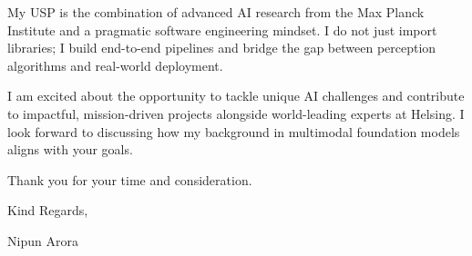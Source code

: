 \documentclass[11pt, a4paper]{letter}
\begin{document}
\vspace{0.2cm}
My USP is the combination of advanced AI research from the Max Planck Institute  and a pragmatic software engineering mindset. I do not just import libraries; I build end-to-end pipelines  and bridge the gap between perception algorithms and real-world deployment. 

\vspace{0.2cm}
I am excited about the opportunity to tackle unique AI challenges and contribute to impactful, mission-driven projects alongside world-leading experts at Helsing. I look forward to discussing how my background in multimodal foundation models aligns with your goals.

Thank you for your time and consideration.

\vspace{0.2cm}

\noindent Kind Regards,

\vspace{0.1cm} 

\noindent Nipun Arora 
\end{document}
